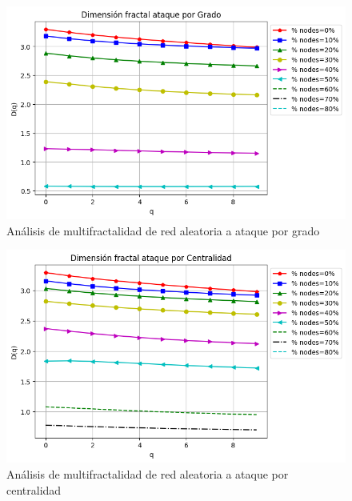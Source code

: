 \begin{figure}[H]
    \centering
    \includegraphics[scale=0.7]{Capitulo6MultifractalidadYRobustez/imagenes/grafica_DqDegree20180501_072543Random1991Nodes5939.png}
    \caption{Análisis de multifractalidad de red aleatoria a ataque por grado }
\end{figure}

\begin{figure}[H]
    \centering
    \includegraphics[scale=0.7]{Capitulo6MultifractalidadYRobustez/imagenes/grafica_DqCentrality20180501_072543Random1991Nodes5939.png}
    \caption{Análisis de multifractalidad de red aleatoria a ataque por centralidad}
\end{figure}


